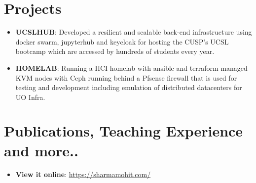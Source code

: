 \documentclass[letterpaper,10.5pt]{article}
\newcommand{\resumeItem}[2]{
\item\small{
\textbf{#1}{: #2 \vspace{-2pt}}
}
}
\newcommand{\resumeSubItem}[2]{\resumeItem{#1}{#2}\vspace{-4pt}}
\newcommand{\resumeSubHeadingListStart}{\begin{itemize}[leftmargin=*]}
\newcommand{\resumeSubHeadingListEnd}{\end{itemize}}
\begin{document}
\section{\color[HTML]{DF691A} Projects}
\resumeSubHeadingListStart
\resumeSubItem{UCSLHUB}
{Developed a resilient and scalable back-end infrastructure using docker swarm, jupyterhub and keycloak for hosting the CUSP's UCSL bootcamp which are accessed by hundreds of students every year.}
\resumeSubItem{HOMELAB}
{Running a HCI homelab with ansible and terraform managed KVM nodes with Ceph running behind a Pfsense firewall that is used for testing and development including emulation of distributed datacenters for UO Infra.}
\resumeSubHeadingListEnd

\section{\color[HTML]{DF691A} Publications, Teaching Experience and more..}
\resumeSubHeadingListStart
\resumeItem{View it online}{\href{https://sharmamohit.com/work/}{https://sharmamohit.com/}}
\newline
\resumeSubHeadingListEnd
\end{document}
